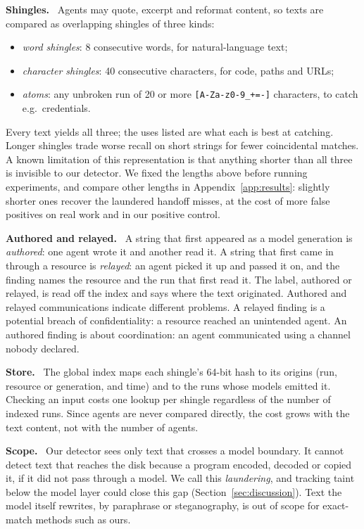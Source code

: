 \documentclass[11pt,a4paper]{article}
\newcommand{\lead}[1]{\textbf{#1}\ }
\begin{document}
\lead{Shingles.} Agents may quote, excerpt and reformat content, so texts are compared as overlapping shingles \cite{broder1997} of three kinds:
\begin{itemize}
  \item \emph{word shingles}: 8 consecutive words, for natural-language text;
  \item \emph{character shingles}: 40 consecutive characters, for code, paths and URLs;
  \item \emph{atoms}: any unbroken run of 20 or more \texttt{[A-Za-z0-9\_+=-]} characters, to catch e.g.\ credentials.
\end{itemize}
 Every text yields all three; the uses listed are what each is best at catching. Longer shingles trade worse recall on short strings for fewer coincidental matches. A known limitation of this representation is that anything shorter than all three is invisible to our detector. We fixed the lengths above before running experiments, and compare other lengths in Appendix~\ref{app:results}: slightly shorter ones recover the laundered handoff misses, at the cost of more false positives on real work and in our positive control.

\lead{Authored and relayed.} A string that first appeared as a model generation is \emph{authored}: one agent wrote it and another read it. A string that first came in through a resource is \emph{relayed}: an agent picked it up and passed it on, and the finding names the resource and the run that first read it. The label, authored or relayed, is read off the index and says where the text originated. Authored and relayed communications indicate different problems. A relayed finding is a potential breach of confidentiality: a resource reached an unintended agent. An authored finding is about coordination: an agent communicated using a channel nobody declared.

\lead{Store.} The global index maps each shingle's 64-bit hash to its origins (run, resource or generation, and time) and to the runs whose models emitted it. Checking an input costs one lookup per shingle regardless of the number of indexed runs. Since agents are never compared directly, the cost grows with the text content, not with the number of agents.

\lead{Scope.} Our detector sees only text that crosses a model boundary. It cannot detect text that reaches the disk because a program encoded, decoded or copied it, if it did not pass through a model. We call this \emph{laundering}, and tracking taint below the model layer could close this gap (Section~\ref{sec:discussion}). Text the model itself rewrites, by paraphrase or steganography, is out of scope for exact-match methods such as ours.
\end{document}
